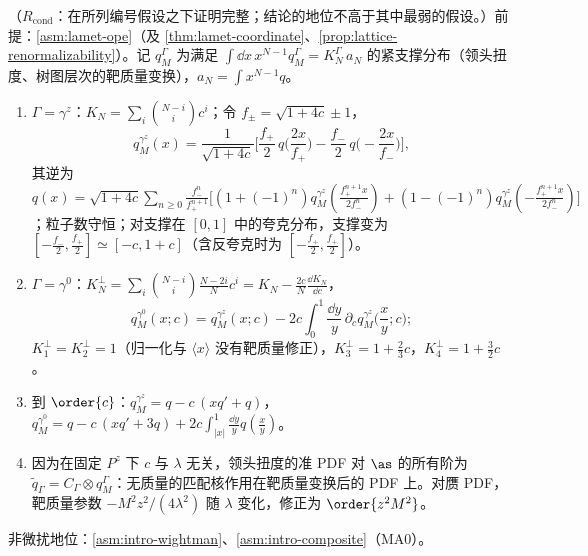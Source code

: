 \begin{proposition}\label{prop:lamet-tmc}
（$R_{\mathrm{cond}}$：在所列编号假设之下证明完整；结论的地位不高于其中最弱的假设。）前提：\cref{asm:lamet-ope}（及 \cref{thm:lamet-coordinate}、\cref{prop:lattice-renormalizability}）。记 $q^\Gamma_M$ 为满足 $\int\dd x\,x^{N-1}q^\Gamma_M=K^\Gamma_N\,a_N$ 的紧支撑分布（领头扭度、树图层次的靶质量变换），$a_N=\int x^{N-1}q$。
\begin{enumerate}[label=(\alph*),leftmargin=2em,itemsep=1pt,topsep=2pt]
\item $\Gamma=\gamma^z$：$K_N=\sum_i\binom{N-i}ic^i$；令 $f_\pm=\sqrt{1+4c}\pm1$，
\begin{equation}\label{eq:lamet-tmc-z}
q^{\gamma^z}_M(x)=\frac1{\sqrt{1+4c}}\Big[\frac{f_+}2\,q\Big(\frac{2x}{f_+}\Big)-\frac{f_-}2\,q\Big(-\frac{2x}{f_-}\Big)\Big],
\end{equation}%
其逆为 $q(x)=\sqrt{1+4c}\sum_{n\ge0}\frac{f_-^n}{f_+^{n+1}}\big[(1+(-1)^n)q^{\gamma^z}_M(\frac{f_+^{n+1}x}{2f_-^n})+(1-(-1)^n)q^{\gamma^z}_M(-\frac{f_+^{n+1}x}{2f_-^n})\big]$；粒子数守恒；对支撑在 $[0,1]$ 中的夸克分布，支撑变为 $[-\frac{f_-}2,\frac{f_+}2]\simeq[-c,1+c]$（含反夸克时为 $[-\frac{f_+}2,\frac{f_+}2]$）。
\item $\Gamma=\gamma^0$：$K^\perp_N=\sum_i\binom{N-i}i\frac{N-2i}Nc^i=K_N-\frac{2c}N\frac{\dd K_N}{\dd c}$，
\begin{equation}\label{eq:lamet-tmc-0}
q^{\gamma^0}_M(x;c)=q^{\gamma^z}_M(x;c)-2c\int_0^1\frac{\dd y}y\,\partial_c q^{\gamma^z}_M\Big(\frac xy;c\Big);
\end{equation}
$K^\perp_1=K^\perp_2=1$（归一化与 $\langle x\rangle$ 没有靶质量修正），$K^\perp_3=1+\frac23c$，$K^\perp_4=1+\frac32c$。
\item 到 $\order{c}$：$q^{\gamma^z}_M=q-c\,(xq'+q)$，$q^{\gamma^0}_M=q-c\,(xq'+3q)+2c\int_{|x|}^1\frac{\dd y}yq(\frac xy)$。
\item 因为在固定 $P^z$ 下 $c$ 与 $\lambda$ 无关，领头扭度的准 PDF 对 $\as$ 的所有阶为 $\tilde q_\Gamma=C_\Gamma\otimes q^\Gamma_M$：无质量的匹配核作用在靶质量变换后的 PDF 上。对赝 PDF，靶质量参数 $-M^2z^2/(4\lambda^2)$ 随 $\lambda$ 变化，修正为 $\order{z^2M^2}$。
\end{enumerate}
非微扰地位：\cref{asm:intro-wightman}、\cref{asm:intro-composite}（MA0）。
\end{proposition}

